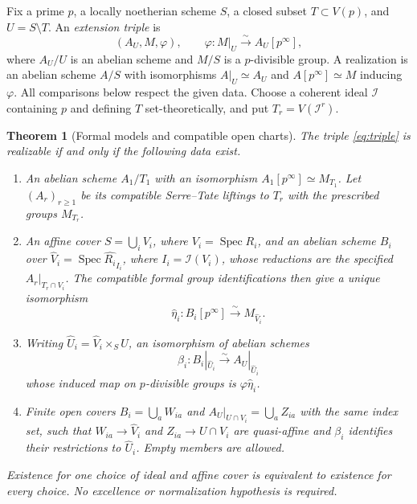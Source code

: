 \documentclass[11pt]{article}
\newtheorem{theorem}{Theorem}[section]
\theoremstyle{definition}\newtheorem{definition}[theorem]{Definition}
\theoremstyle{remark}\newtheorem{remark}[theorem]{Remark}
\newcommand{\Spec}{\operatorname{Spec}}
\begin{document}
Fix a prime $p$, a locally noetherian scheme $S$, a closed subset $T\subset V(p)$, and $U=S\setminus T$. An \emph{extension triple} is
\begin{equation}\label{eq:triple}
 (A_U,M,\varphi),\qquad \varphi:M|_U\xrightarrow{\sim}A_U[p^\infty],
\end{equation}
where $A_U/U$ is an abelian scheme and $M/S$ is a $p$-divisible group. A realization is an abelian scheme $A/S$ with isomorphisms $A|_U\simeq A_U$ and $A[p^\infty]\simeq M$ inducing $\varphi$. All comparisons below respect the given data. Choose a coherent ideal $\mathcal I$ containing $p$ and defining $T$ set-theoretically, and put $T_r=V(\mathcal I^r)$.

\begin{theorem}[Formal models and compatible open charts]\label{thm:formal}
The triple \eqref{eq:triple} is realizable if and only if the following data exist.
\begin{enumerate}
\item An abelian scheme $A_1/T_1$ with an isomorphism $A_1[p^\infty]\simeq M_{T_1}$. Let $(A_r)_{r\geq1}$ be its compatible Serre--Tate liftings to $T_r$ with the prescribed groups $M_{T_r}$.
\item An affine cover $S=\bigcup_i V_i$, where $V_i=\Spec R_i$, and an abelian scheme $B_i$ over $\widehat V_i=\Spec\widehat{R_i}_{I_i}$, where $I_i=\mathcal I(V_i)$, whose reductions are the specified $A_r|_{T_r\cap V_i}$. The compatible formal group identifications then give a unique isomorphism
\[
 \widehat\eta_i:B_i[p^\infty]\xrightarrow{\sim}M_{\widehat V_i}.
\]
\item Writing $\widehat U_i=\widehat V_i\times_S U$, an isomorphism of abelian schemes
\begin{equation}\label{eq:overlap}
 \beta_i:B_i|_{\widehat U_i}\xrightarrow{\sim}A_U|_{\widehat U_i}
\end{equation}
whose induced map on $p$-divisible groups is $\varphi\widehat\eta_i$.
\item Finite open covers $B_i=\bigcup_a W_{ia}$ and $A_U|_{U\cap V_i}=\bigcup_a Z_{ia}$ with the same index set, such that $W_{ia}\to\widehat V_i$ and $Z_{ia}\to U\cap V_i$ are quasi-affine and $\beta_i$ identifies their restrictions to $\widehat U_i$. Empty members are allowed.
\end{enumerate}
Existence for one choice of ideal and affine cover is equivalent to existence for every choice. No excellence or normalization hypothesis is required.
\end{theorem}
\end{document}
